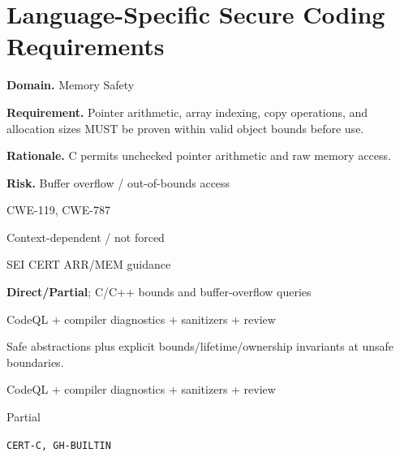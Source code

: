 \documentclass[10pt,letterpaper]{article}
\newcommand{\prioritybadge}[2]{\tcbox[on line,boxrule=0pt,arc=1.2mm,boxsep=0.7mm,left=1mm,right=1mm,top=0.4mm,bottom=0.4mm,colback=#2!12,coltext=#2]{\scriptsize\bfseries #1}}
\begin{document}
\section{Language-Specific Secure Coding Requirements}
\begin{rulebox}[title={\texttt{SCS-C-MEM-001} \hfill \prioritybadge{Critical Control}{Critical}}]
\textbf{Domain.} Memory Safety

\textbf{Requirement.} Pointer arithmetic, array indexing, copy operations, and allocation sizes MUST be proven within valid object bounds before use.

\textbf{Rationale.} C permits unchecked pointer arithmetic and raw memory access.

\textbf{Risk.} Buffer overflow / out-of-bounds access

\begin{description}[leftmargin=2.65cm,labelwidth=2.3cm,style=nextline,itemsep=1pt,topsep=3pt]
  \item[CWE] CWE-119, CWE-787
  \item[OWASP] Context-dependent / not forced
  \item[CERT] SEI CERT ARR/MEM guidance
  \item[CodeQL] \textbf{Direct/Partial}; C/C++ bounds and buffer-overflow queries
  \item[Enforcement] CodeQL + compiler diagnostics + sanitizers + review
  \item[Prevention] Safe abstractions plus explicit bounds/lifetime/ownership invariants at unsafe boundaries.
  \item[Verification] CodeQL + compiler diagnostics + sanitizers + review
  \item[Automation] Partial
  \item[Sources] \texttt{CERT-C, GH-BUILTIN}
\end{description}
\end{rulebox}
\end{document}
